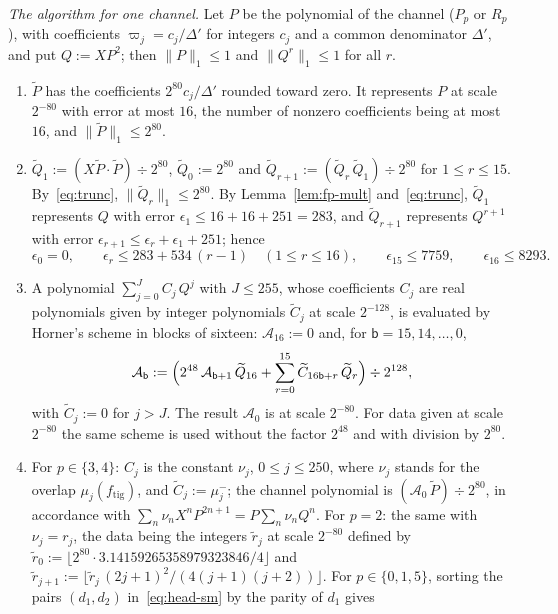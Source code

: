 \documentclass[11pt,reqno]{amsart}
\theoremstyle{definition}
\numberwithin{equation}{section}
\newcommand{\lone}[1]{\|#1\|_1}
\newcommand{\ftig}{f_{\mathrm{tig}}}
\begin{document}
\emph{The algorithm for one channel.} Let $P$ be the polynomial of the channel ($P_p$ or $R_p$), with coefficients $\varpi_j=c_j/\Delta'$ for integers $c_j$ and a common denominator $\Delta'$, and put $Q:=XP^2$; then $\lone{P}\le1$ and $\lone{Q^r}\le1$ for all $r$.
\begin{enumerate}
  \item $\widetilde P$ has the coefficients $2^{80}c_j/\Delta'$ rounded toward zero. It represents $P$ at scale $2^{-80}$ with error at most $16$, the number of nonzero coefficients being at most $16$, and $\lone{\widetilde P}\le2^{80}$.
  \item $\widetilde Q_1:=(X\widetilde P\cdot\widetilde P)\div2^{80}$, $\widetilde Q_0:=2^{80}$ and $\widetilde Q_{r+1}:=(\widetilde Q_r\,\widetilde Q_1)\div2^{80}$ for $1\le r\le15$. By~\eqref{eq:trunc}, $\lone{\widetilde Q_r}\le2^{80}$. By Lemma~\ref{lem:fp-mult} and~\eqref{eq:trunc}, $\widetilde Q_1$ represents $Q$ with error $\epsilon_1\le16+16+251=283$, and $\widetilde Q_{r+1}$ represents $Q^{r+1}$ with error $\epsilon_{r+1}\le\epsilon_r+\epsilon_1+251$; hence
  \begin{equation}\label{eq:pow-err}
    \epsilon_0=0,\qquad\epsilon_r\le283+534\,(r-1)\quad(1\le r\le16),\qquad\epsilon_{15}\le7759,\qquad\epsilon_{16}\le8293 .
  \end{equation}
  \item A polynomial $\sum_{j=0}^{J}C_j\,Q^j$ with $J\le255$, whose coefficients $C_j$ are real polynomials given by integer polynomials $\widetilde C_j$ at scale $2^{-128}$, is evaluated by Horner's scheme in blocks of sixteen: $\mathcal{A}_{16}:=0$ and, for $\mathsf{b}=15,14,\dots,0$,
  \begin{equation}\label{eq:block-horner}
    \mathcal{A}_{\mathsf{b}}:=\Bigl(2^{48}\,\mathcal{A}_{\mathsf{b}+1}\,\widetilde Q_{16}+\sum_{r=0}^{15}\widetilde C_{16\mathsf{b}+r}\,\widetilde Q_r\Bigr)\div2^{128},
  \end{equation}
  with $\widetilde C_j:=0$ for $j>J$. The result $\mathcal{A}_0$ is at scale $2^{-80}$. For data given at scale $2^{-80}$ the same scheme is used without the factor $2^{48}$ and with division by $2^{80}$.
  \item For $p\in\{3,4\}$: $C_j$ is the constant $\nu_j$, $0\le j\le250$, where $\nu_j$ stands for the overlap $\mu_j(\ftig)$, and $\widetilde C_j:=\mu_j^-$; the channel polynomial is $(\mathcal{A}_0\,\widetilde P)\div2^{80}$, in accordance with $\sum_n\nu_nX^nP^{2n+1}=P\sum_n\nu_nQ^n$. For $p=2$: the same with $\nu_j=r_j$, the data being the integers $\tilde r_j$ at scale $2^{-80}$ defined by $\tilde r_0:=\lfloor2^{80}\cdot3.14159265358979323846/4\rfloor$ and $\tilde r_{j+1}:=\lfloor\tilde r_j\,(2j+1)^2/(4(j+1)(j+2))\rfloor$. For $p\in\{0,1,5\}$, sorting the pairs $(d_1,d_2)$ in~\eqref{eq:head-sm} by the parity of $d_1$ gives

\end{enumerate}
\end{document}
